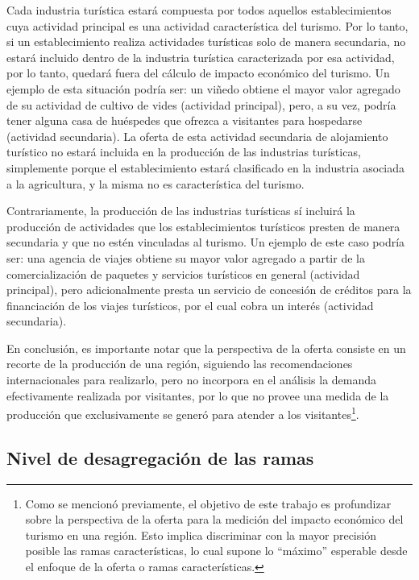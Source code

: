 \documentclass[
  openany]{book}
\begin{document}
Cada industria turística estará compuesta por todos aquellos establecimientos cuya actividad principal es una actividad característica del turismo. Por lo tanto, si un establecimiento realiza actividades turísticas solo de manera secundaria, no estará incluido dentro de la industria turística caracterizada por esa actividad, por lo tanto, quedará fuera del cálculo de impacto económico del turismo. Un ejemplo de esta situación podría ser: un viñedo obtiene el mayor valor agregado de su actividad de cultivo de vides (actividad principal), pero, a su vez, podría tener alguna casa de huéspedes que ofrezca a visitantes para hospedarse (actividad secundaria). La oferta de esta actividad secundaria de alojamiento turístico no estará incluida en la producción de las industrias turísticas, simplemente porque el establecimiento estará clasificado en la industria asociada a la agricultura, y la misma no es característica del turismo.

Contrariamente, la producción de las industrias turísticas sí incluirá la producción de actividades que los establecimientos turísticos presten de manera secundaria y que no estén vinculadas al turismo. Un ejemplo de este caso podría ser: una agencia de viajes obtiene su mayor valor agregado a partir de la comercialización de paquetes y servicios turísticos en general (actividad principal), pero adicionalmente presta un servicio de concesión de créditos para la financiación de los viajes turísticos, por el cual cobra un interés (actividad secundaria).

En conclusión, es importante notar que la perspectiva de la oferta consiste en un recorte de la producción de una región, siguiendo las recomendaciones internacionales para realizarlo, pero no incorpora en el análisis la demanda efectivamente realizada por visitantes, por lo que no provee una medida de la producción que exclusivamente se generó para atender a los visitantes\footnote{Como se mencionó previamente, el objetivo de este trabajo es profundizar sobre la perspectiva de la oferta para la medición del impacto económico del turismo en una región. Esto implica discriminar con la mayor precisión posible las ramas características, lo cual supone lo ``máximo'' esperable desde el enfoque de la oferta o ramas características.}.

\hypertarget{nivel-de-desagregacion-de-las-ramas}{%
\subsection{Nivel de desagregación de las ramas}\label{nivel-de-desagregacion-de-las-ramas}}
\end{document}
